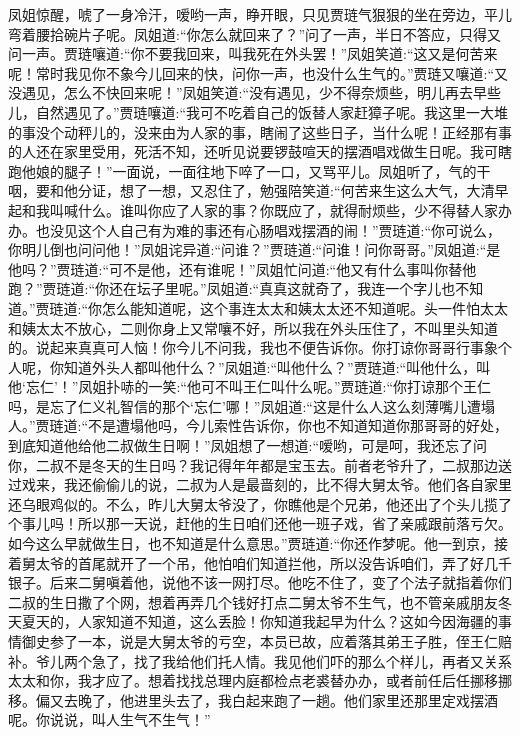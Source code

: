 \begin{parag}
    凤姐惊醒，唬了一身冷汗，嗳哟一声，睁开眼，只见贾琏气狠狠的坐在旁边，平儿弯着腰拾碗片子呢。凤姐道:“你怎么就回来了？”问了一声，半日不答应，只得又问一声。贾琏嚷道:“你不要我回来，叫我死在外头罢！”凤姐笑道:“这又是何苦来呢！常时我见你不象今儿回来的快，问你一声，也没什么生气的。”贾琏又嚷道:“又没遇见，怎么不快回来呢！”凤姐笑道:“没有遇见，少不得奈烦些，明儿再去早些儿，自然遇见了。”贾琏嚷道:“我可不吃着自己的饭替人家赶獐子呢。我这里一大堆的事没个动秤儿的，没来由为人家的事，瞎闹了这些日子，当什么呢！正经那有事的人还在家里受用，死活不知，还听见说要锣鼓喧天的摆酒唱戏做生日呢。我可瞎跑他娘的腿子！”一面说，一面往地下啐了一口，又骂平儿。凤姐听了，气的干咽，要和他分证，想了一想，又忍住了，勉强陪笑道:“何苦来生这么大气，大清早起和我叫喊什么。谁叫你应了人家的事？你既应了，就得耐烦些，少不得替人家办办。也没见这个人自己有为难的事还有心肠唱戏摆酒的闹！”贾琏道:“你可说么，你明儿倒也问问他！”凤姐诧异道:“问谁？”贾琏道:“问谁！问你哥哥。”凤姐道:“是他吗？”贾琏道:“可不是他，还有谁呢！”凤姐忙问道:“他又有什么事叫你替他跑？”贾琏道:“你还在坛子里呢。”凤姐道:“真真这就奇了，我连一个字儿也不知道。”贾琏道:“你怎么能知道呢，这个事连太太和姨太太还不知道呢。头一件怕太太和姨太太不放心，二则你身上又常嚷不好，所以我在外头压住了，不叫里头知道的。说起来真真可人恼！你今儿不问我，我也不便告诉你。你打谅你哥哥行事象个人呢，你知道外头人都叫他什么？”凤姐道:“叫他什么？”贾琏道:“叫他什么，叫他‘忘仁’！”凤姐扑哧的一笑:“他可不叫王仁叫什么呢。”贾琏道:“你打谅那个王仁吗，是忘了仁义礼智信的那个‘忘仁’哪！”凤姐道:“这是什么人这么刻薄嘴儿遭塌人。”贾琏道:“不是遭塌他吗，今儿索性告诉你，你也不知道知道你那哥哥的好处，到底知道他给他二叔做生日啊！”凤姐想了一想道:“嗳哟，可是呵，我还忘了问你，二叔不是冬天的生日吗？我记得年年都是宝玉去。前者老爷升了，二叔那边送过戏来，我还偷偷儿的说，二叔为人是最啬刻的，比不得大舅太爷。他们各自家里还乌眼鸡似的。不么，昨儿大舅太爷没了，你瞧他是个兄弟，他还出了个头儿揽了个事儿吗！所以那一天说，赶他的生日咱们还他一班子戏，省了亲戚跟前落亏欠。如今这么早就做生日，也不知道是什么意思。”贾琏道:“你还作梦呢。他一到京，接着舅太爷的首尾就开了一个吊，他怕咱们知道拦他，所以没告诉咱们，弄了好几千银子。后来二舅嗔着他，说他不该一网打尽。他吃不住了，变了个法子就指着你们二叔的生日撒了个网，想着再弄几个钱好打点二舅太爷不生气，也不管亲戚朋友冬天夏天的，人家知道不知道，这么丢脸！你知道我起早为什么？这如今因海疆的事情御史参了一本，说是大舅太爷的亏空，本员已故，应着落其弟王子胜，侄王仁赔补。爷儿两个急了，找了我给他们托人情。我见他们吓的那么个样儿，再者又关系太太和你，我才应了。想着找找总理内庭都检点老裘替办办，或者前任后任挪移挪移。偏又去晚了，他进里头去了，我白起来跑了一趟。他们家里还那里定戏摆酒呢。你说说，叫人生气不生气！”
\end{parag}


